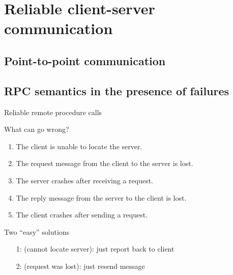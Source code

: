 \section{Reliable client-server communication}
\subsection{Point-to-point communication}
\subsection{RPC semantics in the presence of failures}
\begin{slide}{Reliable remote procedure calls}
  \begin{block}{What can go wrong?}
    \begin{enumerate}
    \item The client is unable to locate the server.
    \item The request message from the client to the server is lost.
    \item The server crashes after receiving a request.
    \item The reply message from the server to the client is lost.
    \item The client crashes after sending a request.
    \end{enumerate}
  \end{block}
  \onslide
  \begin{block}{Two ``easy'' solutions}
    \begin{itemize}
    \item[1:] (cannot locate server): just report back to client
    \item[2:] (request was lost): just resend message
    \end{itemize}
  \end{block}
\end{slide}

